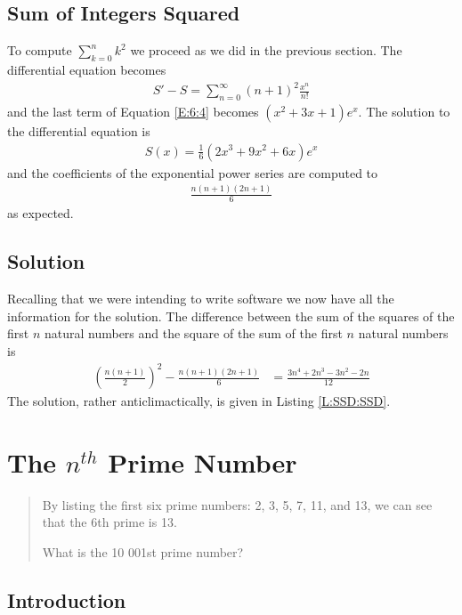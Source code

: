 \documentclass[oneside,12pt]{book}   	%
\newcounter{ex}
\newcounter{pr}
\theoremstyle{definition}
\begin{document}
\begin{spacing}{1.618}
		\section{Sum of Integers Squared}
		
			To compute $\sum_{k=0}^nk^2$ we proceed as we did in the previous section. The differential equation becomes
			\begin{alignat}{4}
				S'-S=\sum_{n=0}^\infty (n+1)^2\frac{x^n}{n!}\label{E:6:4}
			\end{alignat}
			and the last term of Equation \ref{E:6:4} becomes $\left(x^2+3x+1\right)e^x$. The solution to the differential equation is
			\begin{alignat*}{4}
				S(x)=\frac{1}{6}\left(2x^3+9x^2+6x\right)e^x
			\end{alignat*}
			and the coefficients of the exponential power series are computed to 
			\begin{alignat}{4}
				\frac{n(n+1)(2n+1)}{6}
			\end{alignat}
			as expected. 
		\section{Solution}
			Recalling that we were intending to write software we now have all the information for the solution. The difference between the sum of the squares of the first $n$ natural numbers and the square of the sum of the first $n$ natural numbers is 
			\begin{alignat}{4}
				\left(\frac{n(n+1)}{2}\right)^2-\frac{n(n+1)(2n+1)}{6}&=\frac{3n^4+2n^3-3n^2-2n}{12}
			\end{alignat}
			The solution, rather anticlimactically, is given in Listing \ref{L:SSD:SSD}. 
			
			
	
	\chapter{The $n^{th}$ Prime Number}
	
		\begin{quote}
			By listing the first six prime numbers: 2, 3, 5, 7, 11, and 13, we can see that the 6th prime is 13.

			What is the 10 001st prime number?
		\end{quote}
		
		\section{Introduction}
		

\end{spacing}
\end{document}
